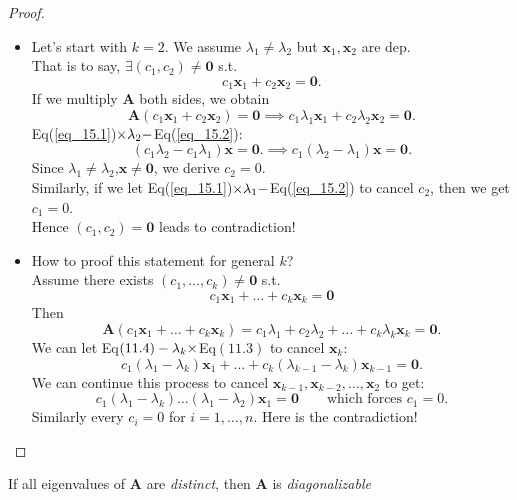 \begin{proof}\begin{itemize}
\item
Let's start with $k=2$. We assume $\lambda_1\ne\lambda_2$ but $\bm x_1,\bm x_2$ are dep.\\ That is to say, $\exists(c_1,c_2)\ne\bm 0$ s.t.
\begin{equation}\label{eq_15.1}
c_1\bm x_1+c_2\bm x_2=\bm 0.
\end{equation}
If we multiply $\bm A$ both sides, we obtain
\begin{equation}\label{eq_15.2}
\bm A(c_1\bm x_1+c_2\bm x_2)=\bm 0
\implies
c_1\lambda_1\bm x_1+c_2\lambda_2\bm x_2=\bm 0.
\end{equation}
Eq(\ref{eq_15.1})$\times\lambda_2-$Eq(\ref{eq_15.2}):
\[
(c_1\lambda_2-c_1\lambda_1)\bm x=\bm 0.
\implies
c_1(\lambda_2-\lambda_1)\bm x=\bm 0.
\]
Since $\lambda_1\ne\lambda_2$,$\bm x\ne\bm 0$, we derive $c_2=0$.\\
Similarly, if we let Eq(\ref{eq_15.1})$\times\lambda_1-$Eq(\ref{eq_15.2}) to cancel $c_2$, then we get $c_1=0$.\\
Hence $(c_1,c_2)=\bm 0$ leads to contradiction!
\item
How to proof this statement for general $k$?\\
Assume there exists $(c_1,\dots,c_k)\ne\bm 0$ s.t.
\begin{equation}
c_1\bm x_1+\dots+c_k\bm x_k=\bm 0
\end{equation}
Then 
\begin{equation}
\bm A(c_1\bm x_1+\dots+c_k\bm x_k)=c_1\lambda_1+c_2\lambda_2+\dots+c_k\lambda_k\bm x_k=\bm 0.
\end{equation}
We can let Eq$(11.4)-\lambda_k\times $Eq$(11.3)$ to cancel $\bm x_k$:
\begin{equation}
c_1(\lambda_1-\lambda_k)\bm x_1+\dots+c_k(\lambda_{k-1}-\lambda_k)\bm x_{k-1}=\bm 0.
\end{equation}
We can continue this process to cancel $\bm x_{k-1},\bm x_{k-2},\dots,\bm x_2$ to get:
\[
c_1(\lambda_1-\lambda_k)\dots(\lambda_1-\lambda_2)\bm x_1=\bm 0\qquad
\text{which forces }c_1=0.
\]
Similarly every $c_i=0$ for $i=1,\dots,n$. Here is the contradiction!
\end{itemize}
\end{proof}
\begin{corollary}
If all eigenvalues of $\bm A$ are \textit{distinct}, then $\bm A$ is \textit{diagonalizable}
\end{corollary}
